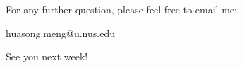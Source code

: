 \begin{frame}{}
\centering  
For any further question, please feel free to email me:\vspace{10pt}

huasong.meng@u.nus.edu \vspace{20pt}

See you next week!
\end{frame}